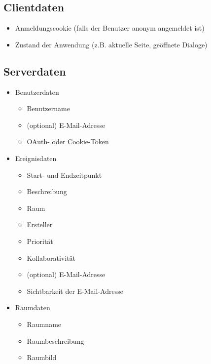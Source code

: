 
\subsection*{Clientdaten}
\begin{itemize}
    \item Anmeldungscookie (falls der Benutzer anonym angemeldet ist)
    \item Zustand der Anwendung (z.B. aktuelle Seite, geöffnete Dialoge)
\end{itemize}

\subsection*{Serverdaten}
\begin{itemize}
    \item Benutzerdaten \begin{itemize}
        \item Benutzername
        \item (optional) E-Mail-Adresse
        \item OAuth- oder Cookie-Token
    \end{itemize}
    \item Ereignisdaten \begin{itemize}
        \item Start- und Endzeitpunkt 
        \item Beschreibung
        \item Raum
        \item Ersteller
        \item Priorität
        \item Kollaborativität
        \item (optional) E-Mail-Adresse
        \item Sichtbarkeit der E-Mail-Adresse
    \end{itemize}
    \item Raumdaten \begin{itemize}
        \item Raumname
        \item Raumbeschreibung
        \item Raumbild
    \end{itemize}
\end{itemize}